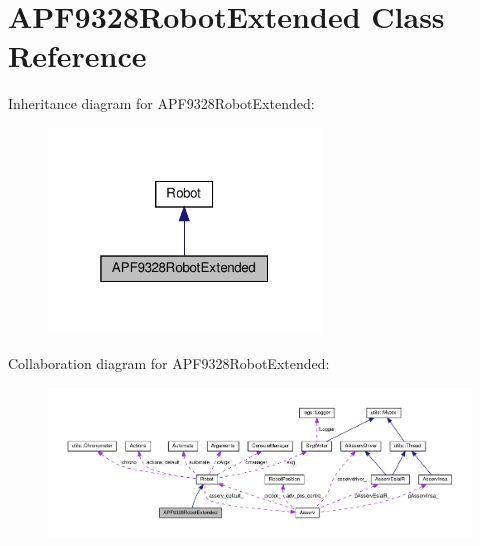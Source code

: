 \hypertarget{classAPF9328RobotExtended}{}\section{A\+P\+F9328\+Robot\+Extended Class Reference}
\label{classAPF9328RobotExtended}


Inheritance diagram for A\+P\+F9328\+Robot\+Extended\+:
\nopagebreak
\begin{figure}[H]
\begin{center}
\leavevmode
\includegraphics[width=205pt]{classAPF9328RobotExtended__inherit__graph}
\end{center}
\end{figure}


Collaboration diagram for A\+P\+F9328\+Robot\+Extended\+:
\nopagebreak
\begin{figure}[H]
\begin{center}
\leavevmode
\includegraphics[width=350pt]{classAPF9328RobotExtended__coll__graph}
\end{center}
\end{figure}
